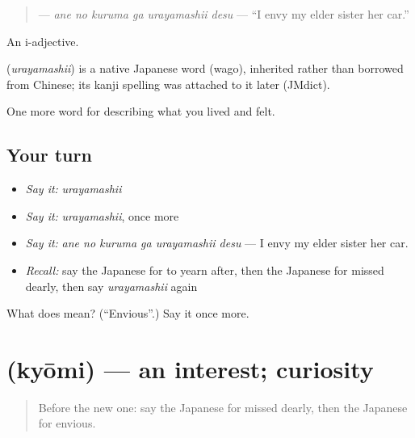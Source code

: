 \begin{quote}
\textbf{  } — \emph{ane no kuruma ga urayamashii desu} — \textquotedblleft{}I envy my elder sister her car.\textquotedblright{}
\end{quote}

An i-adjective.

\begin{cousinweb}
\textbf{} (\emph{urayamashii}) is a native Japanese word (wago), inherited rather than borrowed from Chinese; its kanji spelling was attached to it later (JMdict).
\end{cousinweb}

\begin{grammarlens}[title={What you've built}]
One more word for describing what you lived and felt.
\end{grammarlens}

\subsection*{Your turn}
\begin{itemize}
\raggedright
  \item \emph{Say it:} \emph{urayamashii}
  \item \emph{Say it:} \emph{urayamashii}, once more
  \item \emph{Say it:} \emph{ane no kuruma ga urayamashii desu} — I envy my elder sister her car.
  \item \emph{Recall:} say the Japanese for to yearn after, then the Japanese for missed dearly, then say \emph{urayamashii} again
\end{itemize}

\begin{tcolorbox}[breakable,colback=teal!4,colframe=teal!35!black,title={Before you move on}]
What does  mean? (\textquotedblleft{}Envious\textquotedblright{}.) Say it once more.
\end{tcolorbox}
\section[\texorpdfstring{\ja{きょうみ} (kyōmi)}{きょうみ (kyōmi)}]{ (kyōmi) — an interest; curiosity}

\label{lesson:JA-C433-kyoumi}



\begin{quote}
Before the new one: say the Japanese for missed dearly, then the Japanese for envious.
\end{quote}

